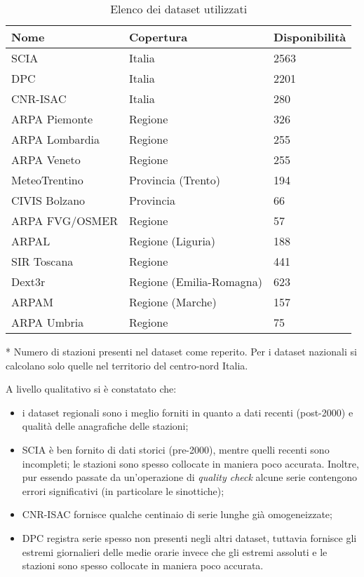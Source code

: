 \begin{table}[ht]
  \centering
  \begin{threeparttable}
    \caption{Elenco dei dataset utilizzati}\label{tab:quick-datasets}
    \begin{tabular}{l l l}
      \toprule
      Nome & Copertura & Disponibilità\tnote{*} \\
      \midrule
      SCIA & Italia & 2563 \\
      DPC & Italia & 2201 \\
      CNR-ISAC & Italia & 280 \\
      ARPA Piemonte & Regione & 326 \\
      ARPA Lombardia & Regione & 255 \\
      ARPA Veneto & Regione & 255 \\
      MeteoTrentino & Provincia (Trento) & 194 \\
      CIVIS Bolzano & Provincia & 66 \\
      ARPA FVG/OSMER & Regione & 57 \\
      ARPAL & Regione (Liguria) & 188 \\
      SIR Toscana & Regione & 441 \\
      Dext3r & Regione (Emilia-Romagna) & 623 \\
      ARPAM & Regione (Marche) & 157 \\
      ARPA Umbria & Regione & 75 \\
      \bottomrule
    \end{tabular}
    \begin{tablenotes}
    \item[*] \small Numero di stazioni presenti nel dataset come reperito. Per i dataset nazionali si calcolano solo quelle nel territorio del centro-nord Italia.
    \end{tablenotes}
  \end{threeparttable}
\end{table}

A livello qualitativo si è constatato che:

\begin{itemize}
  \item
    i dataset regionali sono i meglio forniti in quanto a dati recenti (post-2000) e qualità delle anagrafiche delle stazioni;
  \item
    SCIA è ben fornito di dati storici (pre-2000), mentre quelli recenti sono incompleti; le stazioni sono spesso collocate in maniera poco accurata. Inoltre, pur essendo passate da un'operazione di \emph{quality check} alcune serie contengono errori significativi (in particolare le sinottiche);
  \item
    CNR-ISAC fornisce qualche centinaio di serie lunghe già omogeneizzate;
  \item
    DPC registra serie spesso non presenti negli altri dataset, tuttavia fornisce gli estremi giornalieri delle medie orarie invece che gli estremi assoluti e le stazioni sono spesso collocate in maniera poco accurata.
\end{itemize}

